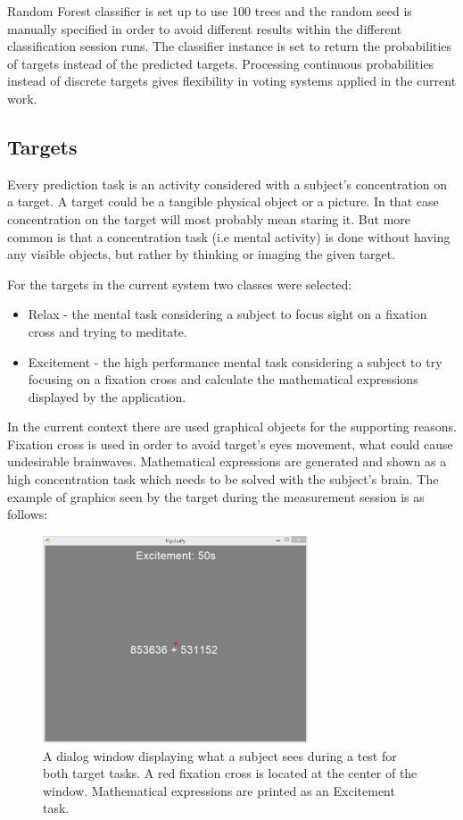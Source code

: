 \documentclass[12pt]{article}
\begin{document}
Random Forest classifier is set up to use 100 trees and the random seed is manually specified in order to avoid different results within the different classification session runs. The classifier instance is set to return the probabilities of targets instead of the predicted targets. Processing continuous probabilities instead of discrete targets gives flexibility in voting systems applied in the current work.

\subsection{Targets}
Every prediction task is an activity considered with a subject's concentration on a target. A target could be a tangible physical object or a picture. In that case concentration on the target will most probably mean staring it. But more common is that a concentration task (i.e mental activity) is done without having any visible objects, but rather by thinking or imaging the given target. 

For the targets in the current system two classes were selected: 
\begin{itemize}
\item Relax - the mental task considering a subject to focus sight on a fixation cross and trying to meditate.
\item Excitement - the high performance mental task considering a subject to try focusing on a fixation cross and calculate the mathematical expressions displayed by the application.
\end{itemize}

In the current context there are used graphical objects for the supporting reasons. Fixation cross is used in order to avoid target's eyes movement, what could cause undesirable brainwaves. Mathematical expressions are generated and shown as a high concentration task which needs to be solved with the subject's brain. The example of graphics seen by the target  during the measurement session is as follows:

\begin{figure} [H]
\begin{center}
\includegraphics[width=0.7\textwidth]{test_ui}
\caption{A dialog window displaying what a subject sees during a test for both target tasks. A red fixation cross is located at the center of the window. Mathematical expressions are printed as an Excitement task.}
\label{fig:fnCompModel}
\end{center}
\end{figure}
\end{document}
